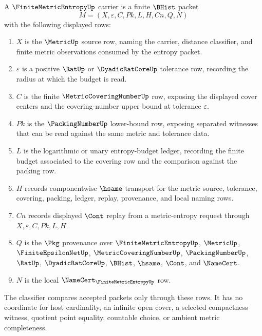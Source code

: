 \begin{definition}
\label{def:finite-metric-entropy-carrier}
A $\FiniteMetricEntropyUp$ carrier is a finite $\BHist$ packet
$$
M=(X,\varepsilon,C,Pk,L,H,Cn,Q,N)
$$
with the following displayed rows:
\begin{enumerate}
\item $X$ is the $\MetricUp$ source row, naming the carrier, distance classifier, and finite metric observations consumed by the entropy packet.
\item $\varepsilon$ is a positive $\RatUp$ or $\DyadicRatCoreUp$ tolerance row, recording the radius at which the budget is read.
\item $C$ is the finite $\MetricCoveringNumberUp$ row, exposing the displayed cover centers and the covering-number upper bound at tolerance $\varepsilon$.
\item $Pk$ is the $\PackingNumberUp$ lower-bound row, exposing separated witnesses that can be read against the same metric and tolerance data.
\item $L$ is the logarithmic or unary entropy-budget ledger, recording the finite budget associated to the covering row and the comparison against the packing row.
\item $H$ records componentwise $\hsame$ transport for the metric source, tolerance, covering, packing, ledger, replay, provenance, and local naming rows.
\item $Cn$ records displayed $\Cont$ replay from a metric-entropy request through $X,\varepsilon,C,Pk,L,H$.
\item $Q$ is the $\Pkg$ provenance over $\FiniteMetricEntropyUp$, $\MetricUp$, $\FiniteEpsilonNetUp$, $\MetricCoveringNumberUp$, $\PackingNumberUp$, $\RatUp$, $\DyadicRatCoreUp$, $\BHist$, $\hsame$, $\Cont$, and $\NameCert$.
\item $N$ is the local $\NameCert_{\FiniteMetricEntropyUp}$ row.
\end{enumerate}
The classifier compares accepted packets only through these rows. It has no coordinate for host cardinality, an infinite open cover, a selected compactness witness, quotient point equality, countable choice, or ambient metric completeness.
\end{definition}


